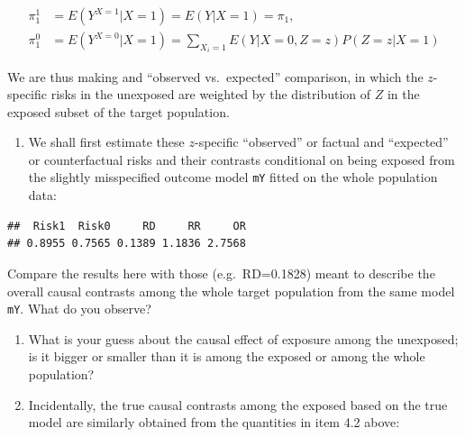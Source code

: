 \documentclass[
]{book}
\newenvironment{Shaded}{\begin{snugshade}}{\end{snugshade}}
\newcommand{\DecValTok}[1]{\textcolor[rgb]{0.00,0.00,0.81}{#1}}
\newcommand{\FunctionTok}[1]{\textcolor[rgb]{0.13,0.29,0.53}{\textbf{#1}}}
\newcommand{\NormalTok}[1]{#1}
\newcommand{\OtherTok}[1]{\textcolor[rgb]{0.56,0.35,0.01}{#1}}
\newcommand{\SpecialCharTok}[1]{\textcolor[rgb]{0.81,0.36,0.00}{\textbf{#1}}}
\providecommand{\tightlist}{%
  \setlength{\itemsep}{0pt}\setlength{\parskip}{0pt}}
\theoremstyle{definition}
\theoremstyle{definition}
\theoremstyle{definition}
\theoremstyle{definition}
\theoremstyle{remark}
\begin{document}
\[\begin{aligned}
 \pi^1_1 & = E(Y^{X=1}|X=1) = E(Y|X=1) = \pi_1, \\
 \pi^0_1 & = E(Y^{X=0}|X=1) = \sum_{X_i=1} E(Y|X=0, Z=z)P(Z=z|X=1)
\end{aligned}\]

We are thus making and ``observed vs.~expected'' comparison, in which the
\(z\)-specific risks in the unexposed are weighted by the distribution of
\(Z\) in the exposed subset of the target population.

\begin{enumerate}
\def\labelenumi{\arabic{enumi}.}
\tightlist
\item
  We shall first estimate these \(z\)-specific ``observed'' or factual and
  ``expected'' or counterfactual risks and their contrasts conditional
  on being exposed from the slightly misspecified outcome model \texttt{mY}
  fitted on the whole population data:
\end{enumerate}

\begin{Shaded}
\end{Shaded}

\begin{verbatim}
##  Risk1  Risk0     RD     RR     OR 
## 0.8955 0.7565 0.1389 1.1836 2.7568
\end{verbatim}

Compare the results here with those (e.g.~RD=0.1828) meant to describe
the overall causal contrasts among the whole target population from the
same model \texttt{mY}. What do you observe?

\begin{enumerate}
\def\labelenumi{\arabic{enumi}.}
\setcounter{enumi}{1}
\item
  What is your guess about the causal effect of exposure among the
  unexposed; is it bigger or smaller than it is among the exposed or
  among the whole population?
\item
  Incidentally, the true causal contrasts among the exposed based on
  the true model are similarly obtained from the quantities in item
  4.2 above:
\end{enumerate}
\end{document}

